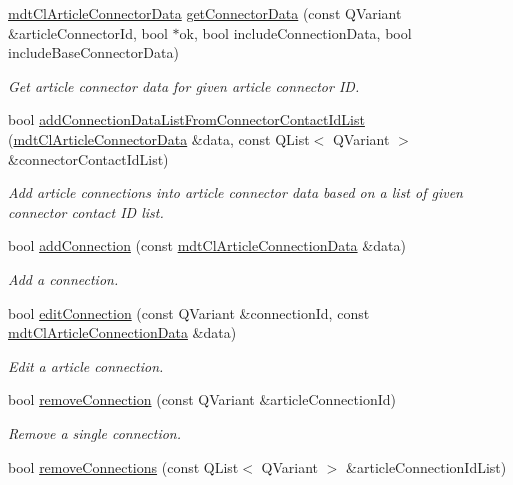 \begin{DoxyCompactItemize}
\hyperlink{classmdt_cl_article_connector_data}{mdt\-Cl\-Article\-Connector\-Data} \hyperlink{classmdt_cl_article_af78bc47b506700568f852a3aa9ab2380}{get\-Connector\-Data} (const Q\-Variant \&article\-Connector\-Id, bool $\ast$ok, bool include\-Connection\-Data, bool include\-Base\-Connector\-Data)
\begin{DoxyCompactList}\small\item\em Get article connector data for given article connector I\-D. \end{DoxyCompactList}\item 
bool \hyperlink{classmdt_cl_article_a21287f0dd3802c24e85a26d8f4cad750}{add\-Connection\-Data\-List\-From\-Connector\-Contact\-Id\-List} (\hyperlink{classmdt_cl_article_connector_data}{mdt\-Cl\-Article\-Connector\-Data} \&data, const Q\-List$<$ Q\-Variant $>$ \&connector\-Contact\-Id\-List)
\begin{DoxyCompactList}\small\item\em Add article connections into article connector data based on a list of given connector contact I\-D list. \end{DoxyCompactList}\item 
bool \hyperlink{classmdt_cl_article_a47317fd8f54e5105c273ba6946eb18be}{add\-Connection} (const \hyperlink{classmdt_cl_article_connection_data}{mdt\-Cl\-Article\-Connection\-Data} \&data)
\begin{DoxyCompactList}\small\item\em Add a connection. \end{DoxyCompactList}\item 
bool \hyperlink{classmdt_cl_article_add1dafdef4f6195860eed12c8722ff66}{edit\-Connection} (const Q\-Variant \&connection\-Id, const \hyperlink{classmdt_cl_article_connection_data}{mdt\-Cl\-Article\-Connection\-Data} \&data)
\begin{DoxyCompactList}\small\item\em Edit a article connection. \end{DoxyCompactList}\item 
bool \hyperlink{classmdt_cl_article_a1797f448906bd064ae53c001f874d670}{remove\-Connection} (const Q\-Variant \&article\-Connection\-Id)
\begin{DoxyCompactList}\small\item\em Remove a single connection. \end{DoxyCompactList}\item 
bool \hyperlink{classmdt_cl_article_a6b3ea8c5ba48000f791afd7da8bb5250}{remove\-Connections} (const Q\-List$<$ Q\-Variant $>$ \&article\-Connection\-Id\-List)

\end{DoxyCompactItemize}
